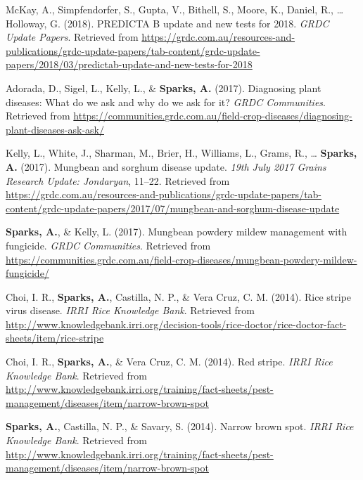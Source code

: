 \documentclass[11pt, a4paper]{awesome-cv}
\begin{document}
\leavevmode{}%
McKay, A., Simpfendorfer, S., Gupta, V., Bithell, S., Moore, K., Daniel,
R., \ldots{} Holloway, G. (2018). {PREDICTA{\textregistered} B} update
and new tests for 2018. \emph{GRDC Update Papers}. Retrieved from
\url{https://grdc.com.au/resources-and-publications/grdc-update-papers/tab-content/grdc-update-papers/2018/03/predictab-update-and-new-tests-for-2018}

\leavevmode{}%
Adorada, D., Sigel, L., Kelly, L., \& \textbf{Sparks, A.} (2017).
Diagnosing plant diseases: {What} do we ask and why do we ask for it?
\emph{GRDC Communities}. Retrieved from
\url{https://communities.grdc.com.au/field-crop-diseases/diagnosing-plant-diseases-ask-ask/}

\leavevmode{}%
Kelly, L., White, J., Sharman, M., Brier, H., Williams, L., Grams, R.,
\ldots{} \textbf{Sparks, A.} (2017). Mungbean and sorghum disease
update. \emph{19th July 2017 Grains Research Update: Jondaryan}, 11--22.
Retrieved from
\url{https://grdc.com.au/resources-and-publications/grdc-update-papers/tab-content/grdc-update-papers/2017/07/mungbean-and-sorghum-disease-update}

\leavevmode{}%
\textbf{Sparks, A.}, \& Kelly, L. (2017). Mungbean powdery mildew
management with fungicide. \emph{GRDC Communities}. Retrieved from
\url{https://communities.grdc.com.au/field-crop-diseases/mungbean-powdery-mildew-fungicide/}

\leavevmode{}%
Choi, I. R., \textbf{Sparks, A.}, Castilla, N. P., \& Vera Cruz, C. M.
(2014). Rice stripe virus disease. \emph{{IRRI} Rice Knowledge Bank}.
Retrieved from
\url{http://www.knowledgebank.irri.org/decision-tools/rice-doctor/rice-doctor-fact-sheets/item/rice-stripe}

\leavevmode{}%
Choi, I. R., \textbf{Sparks, A.}, \& Vera Cruz, C. M. (2014). Red
stripe. \emph{{IRRI} Rice Knowledge Bank}. Retrieved from
\url{http://www.knowledgebank.irri.org/training/fact-sheets/pest-management/diseases/item/narrow-brown-spot}

\leavevmode{}%
\textbf{Sparks, A.}, Castilla, N. P., \& Savary, S. (2014). Narrow brown
spot. \emph{{IRRI} Rice Knowledge Bank}. Retrieved from
\url{http://www.knowledgebank.irri.org/training/fact-sheets/pest-management/diseases/item/narrow-brown-spot}
\end{document}
